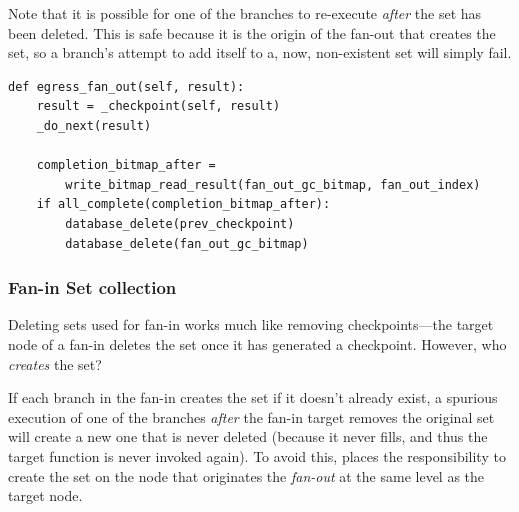 Note that it is possible for one of the branches to re-execute \emph{after} the
set has been deleted. This is safe because it is the origin of the fan-out that
creates the set, so a branch's attempt to add itself to a, now, non-existent set
will simply fail.

\begin{verbatim}
def egress_fan_out(self, result):
    result = _checkpoint(self, result)
    _do_next(result)

    completion_bitmap_after =
        write_bitmap_read_result(fan_out_gc_bitmap, fan_out_index)
    if all_complete(completion_bitmap_after):
        database_delete(prev_checkpoint)
        database_delete(fan_out_gc_bitmap)
\end{verbatim}

\subsubsection{Fan-in Set collection}

Deleting sets used for fan-in works much like removing checkpoints---the target
node of a fan-in deletes the set once it has generated a checkpoint. However,
who \emph{creates} the set?

If each branch in the fan-in creates the set if it doesn't already exist, a
spurious execution of one of the branches \emph{after} the fan-in target removes
the original set will create a new one that is never deleted (because it never
fills, and thus the target function is never invoked again). To avoid this,
\name{} places the responsibility to create the set on the node that originates
the \emph{fan-out} at the same level as the target node.

